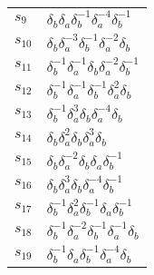 \documentclass{article}
\begin{document}
\begin{center}
\begin{tabular}{ll}
$s_{9}$ & $\delta_b^{}\delta_a^{}\delta_b^{-1}\delta_a^{-4}\delta_b^{-1}$ \\
$s_{10}$ & $\delta_b^{}\delta_a^{-3}\delta_b^{-1}\delta_a^{-2}\delta_b^{}$ \\
$s_{11}$ & $\delta_b^{-1}\delta_a^{-1}\delta_b^{}\delta_a^{-2}\delta_b^{-1}$ \\
$s_{12}$ & $\delta_b^{-1}\delta_a^{-1}\delta_b^{-1}\delta_a^{2}\delta_b^{}$ \\
$s_{13}$ & $\delta_b^{-1}\delta_a^{3}\delta_b^{}\delta_a^{-4}\delta_b^{}$ \\
$s_{14}$ & $\delta_b^{}\delta_a^{2}\delta_b^{}\delta_a^{3}\delta_b^{}$ \\
$s_{15}$ & $\delta_b^{}\delta_a^{-2}\delta_b^{}\delta_a^{}\delta_b^{-1}$ \\
$s_{16}$ & $\delta_b^{}\delta_a^{3}\delta_b^{}\delta_a^{-4}\delta_b^{-1}$ \\
$s_{17}$ & $\delta_b^{-1}\delta_a^{2}\delta_b^{-1}\delta_a^{}\delta_b^{-1}$ \\
$s_{18}$ & $\delta_b^{-1}\delta_a^{-2}\delta_b^{-1}\delta_a^{-1}\delta_b^{}$ \\
$s_{19}$ & $\delta_b^{-1}\delta_a^{}\delta_b^{-1}\delta_a^{-4}\delta_b^{}$ \\
\bottomrule
\end{tabular}
\end{center}

\thispagestyle{empty}
\end{document}
